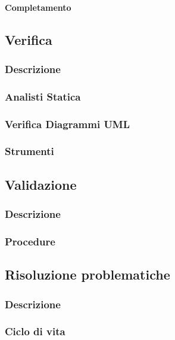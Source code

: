 	\paragraph{Completamento}


\subsection{Verifica}
	\subsubsection{Descrizione}
	\subsubsection{Analisti Statica}
	\subsubsection{Verifica Diagrammi UML}
	\subsubsection{Strumenti}
	
\subsection{Validazione}
	\subsubsection{Descrizione}
	\subsubsection{Procedure}


\subsection{Risoluzione problematiche}

	\subsubsection{Descrizione}
	
	\subsubsection{Ciclo di vita}
